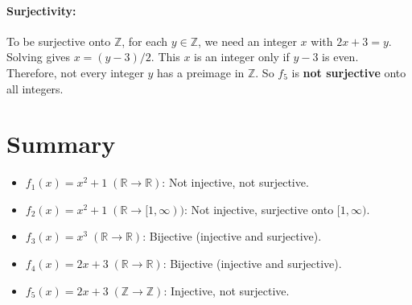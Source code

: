 \documentclass[12pt]{article}
\begin{document}
\paragraph{Surjectivity:}
To be surjective onto $\mathbb{Z}$, for each $y \in \mathbb{Z}$, we need an integer $x$ with $2x + 3 = y$. Solving gives $x = (y-3)/2$. This $x$ is an integer only if $y - 3$ is even. Therefore, not every integer $y$ has a preimage in $\mathbb{Z}$. So $f_5$ is \textbf{not surjective} onto all integers.

\bigskip

\section*{Summary}
\begin{itemize}
\item $f_1(x) = x^2 + 1 \;(\mathbb{R}\to\mathbb{R})$: Not injective, not surjective.
\item $f_2(x) = x^2 + 1 \;(\mathbb{R}\to[1,\infty))$: Not injective, surjective onto $[1,\infty)$.
\item $f_3(x) = x^3 \;(\mathbb{R}\to\mathbb{R})$: Bijective (injective and surjective).
\item $f_4(x) = 2x + 3 \;(\mathbb{R}\to\mathbb{R})$: Bijective (injective and surjective).
\item $f_5(x) = 2x + 3 \;(\mathbb{Z}\to\mathbb{Z})$: Injective, not surjective.
\end{itemize}
\end{document}
